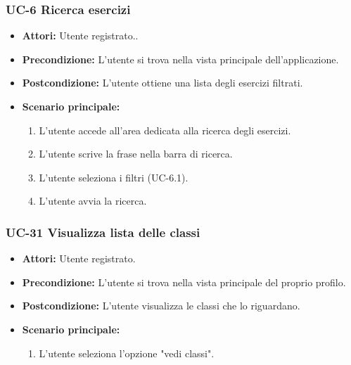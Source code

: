 	
\subsubsection{UC-6 Ricerca esercizi}
		\begin{itemize}
			\item\textbf{ Attori:} Utente registrato..
			\item \textbf{Precondizione:} L'utente si trova nella vista principale dell'applicazione.
			\item \textbf{Postcondizione:} L'utente ottiene una lista degli esercizi filtrati.
			\item \textbf{Scenario principale:}
				\begin{enumerate}
					\item L'utente accede all'area dedicata alla ricerca degli esercizi.
					\item L'utente scrive la frase nella barra di ricerca.
					\item L'utente seleziona i filtri (UC-6.1).
					\item L'utente avvia la ricerca.
				\end{enumerate}
		\end{itemize}

\subsubsection{UC-31 Visualizza lista delle classi}		
\begin{itemize}
	\item \textbf{Attori:} Utente registrato.
	\item \textbf{Precondizione:} L'utente si trova nella vista principale del proprio profilo.
	\item \textbf{Postcondizione:} L'utente visualizza le classi che lo riguardano.
	\item \textbf{Scenario principale:}
	\begin{enumerate}
		\item L'utente seleziona l'opzione "vedi classi".
	\end{enumerate}		
\end{itemize}

		
